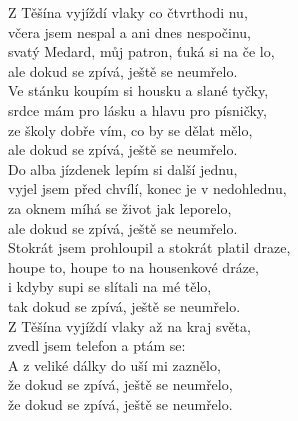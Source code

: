 
Z Těšína vyjíždí vlaky co čtvrthodi nu,\\
včera jsem nespal a ani dnes nespočinu, \\
svatý Medard, můj patron, ťuká si na če \hspace{0.5cm} lo,\\
ale dokud se zpívá, ještě se neumřelo.\\

Ve stánku koupím si housku a slané tyčky,\\
srdce mám pro lásku a hlavu pro písničky,\\
ze školy dobře vím, co by se dělat mělo,\\
ale dokud se zpívá, ještě se neumřelo.\\

Do alba jízdenek lepím si další jednu,\\
vyjel jsem před chvílí, konec je v nedohlednu,\\
za oknem míhá se život jak leporelo,\\
ale dokud se zpívá, ještě se neumřelo.\\

Stokrát jsem prohloupil a stokrát platil draze,\\
houpe to, houpe to na housenkové dráze,\\
i kdyby supi se slítali na mé tělo,\\
tak dokud se zpívá, ještě se neumřelo.\\

Z Těšína vyjíždí vlaky až na kraj světa,\\
zvedl jsem telefon a ptám se: \\
A z veliké dálky do uší mi zaznělo,\\
že dokud se zpívá, ještě se neumřelo,\\
že dokud se zpívá, ještě se neumřelo.

\newpage
